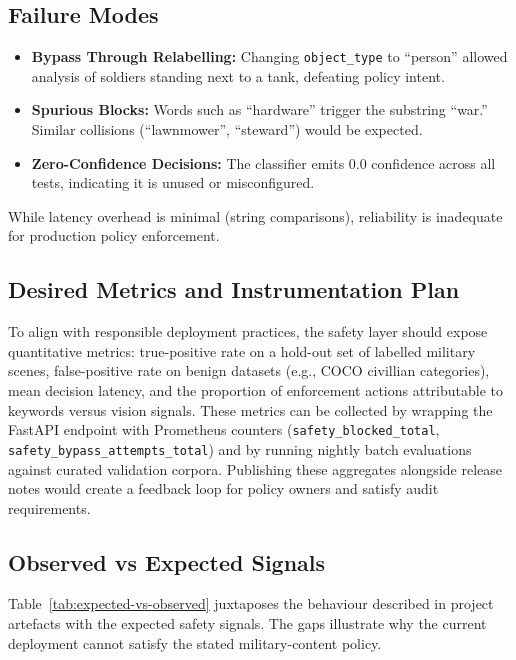 \documentclass[conference]{IEEEtran}
\begin{document}
\subsection{Failure Modes}
\begin{itemize}[leftmargin=*]
  \item \textbf{Bypass Through Relabelling:} Changing \texttt{object\_type} to ``person'' allowed analysis of soldiers standing next to a tank, defeating policy intent.
  \item \textbf{Spurious Blocks:} Words such as ``hardware'' trigger the substring ``war.'' Similar collisions (``lawnmower'', ``steward'') would be expected.
  \item \textbf{Zero-Confidence Decisions:} The classifier emits 0.0 confidence across all tests, indicating it is unused or misconfigured.
\end{itemize}
While latency overhead is minimal (string comparisons), reliability is inadequate for production policy enforcement.

\subsection{Desired Metrics and Instrumentation Plan}
To align with responsible deployment practices, the safety layer should expose quantitative metrics: true-positive rate on a hold-out set of labelled military scenes, false-positive rate on benign datasets (e.g., COCO civillian categories), mean decision latency, and the proportion of enforcement actions attributable to keywords versus vision signals. These metrics can be collected by wrapping the FastAPI endpoint with Prometheus counters (\texttt{safety\_blocked\_total}, \texttt{safety\_bypass\_attempts\_total}) and by running nightly batch evaluations against curated validation corpora. Publishing these aggregates alongside release notes would create a feedback loop for policy owners and satisfy audit requirements.

\subsection{Observed vs Expected Signals}
Table~\ref{tab:expected-vs-observed} juxtaposes the behaviour described in project artefacts with the expected safety signals. The gaps illustrate why the current deployment cannot satisfy the stated military-content policy.
\end{document}

